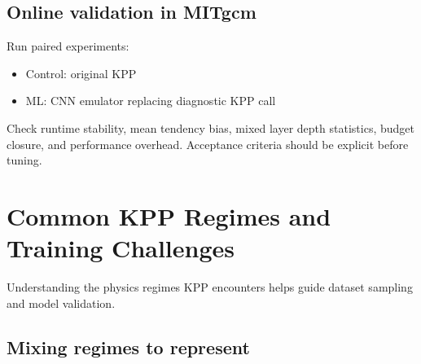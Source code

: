\documentclass[11pt, a4paper]{article}
\begin{document}
\subsection{Online validation in MITgcm}
Run paired experiments:
\begin{itemize}
    \item Control: original KPP
    \item ML: CNN emulator replacing diagnostic KPP call
\end{itemize}
Check runtime stability, mean tendency bias, mixed layer depth statistics, budget closure, and performance overhead.
Acceptance criteria should be explicit before tuning.

\section{Common KPP Regimes and Training Challenges}

Understanding the physics regimes KPP encounters helps guide dataset sampling and model validation.

\subsection{Mixing regimes to represent}
\end{document}
